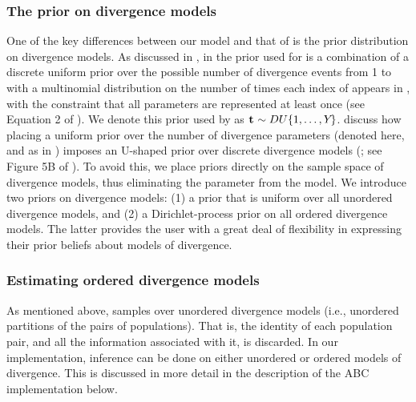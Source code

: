 \subsubsection*{The prior on divergence models}
One of the key differences between our model and that of \msb \citep{Huang2011}
is the prior distribution on divergence models.
As discussed in \citet{Oaks2012}, in \msb the prior used for
\divTimeIndexVector is a combination of a discrete uniform prior over the
possible number of divergence events \divTimeNum from 1 to \npairs{} with a
multinomial distribution on the number of times each index of \divTimeVector
appears in \divTimeIndexVector, with the constraint that all \divTime{}
parameters are represented at least once (see Equation 2 of \citet{Oaks2012}).
We denote this prior used by \msb as $\mathbf{t_{}} \sim DU\{1, \ldots, Y_{}\}$.
\citet{Oaks2012} discuss how placing a uniform prior over the number of
divergence parameters (denoted \divTimeNum here, and as \numt{} in
\citet{Huang2011}) imposes an U-shaped prior over discrete divergence
models (\divTimeIndexVector; see
Figure 5B of \citet{Oaks2012}).
To avoid this, we place priors directly on the sample space of divergence
models, thus eliminating the parameter \numt{} from the model.
We introduce two priors on divergence models:
(1) a prior that is uniform over all unordered divergence models, and
(2) a Dirichlet-process prior on all ordered divergence models.
The latter provides the user with a great deal of flexibility in
expressing their prior beliefs about models of divergence.

\subsubsection*{Estimating ordered divergence models}
As mentioned above, \msb samples over unordered divergence models
(i.e., unordered partitions of the \npairs{} pairs of populations).
That is, the identity of each population pair, and all the information
associated with it, is discarded.
In our implementation, inference can be done on either unordered or ordered
models of divergence.
This is discussed in more detail in the description of the ABC implementation
below.

